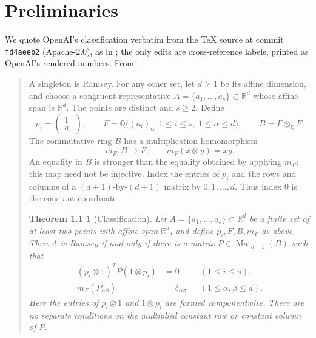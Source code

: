 \documentclass[11pt]{amsart}
\newcommand{\Q}{\mathbb{Q}}
\newcommand{\R}{\mathbb{R}}
\theoremstyle{plain}
\newtheorem*{oaithm}{Theorem 1.1}
\theoremstyle{definition}
\begin{document}
\section{Preliminaries}\label{sec:prelim}

We quote OpenAI's classification verbatim from the \TeX{} source at commit \texttt{fd4aeeb2}
(Apache-2.0), as in \cite{MR}; the only edits are cross-reference labels, printed as OpenAI's
rendered numbers. From \cite[\S1.1]{OAI172}:

{\small
\begin{quote}
A singleton is Ramsey. For any other set, let $d\ge1$ be its affine
dimension, and choose a congruent representative
$A=\{a_1,\ldots,a_s\}\subset\R^d$ whose affine span is $\R^d$.
The points are distinct and $s\ge2$. Define
\[
 p_i=\begin{pmatrix}1\\a_i\end{pmatrix},\qquad
 F=\Q\bigl((a_i)_\alpha:1\le i\le s,\ 1\le\alpha\le d\bigr),
 \qquad B=F\otimes_{\Q}F.
\]
The commutative ring $B$ has a multiplication homomorphism
\[
 m_F:B\longrightarrow F,\qquad m_F(x\otimes y)=xy.
\]
An equality in $B$ is stronger than the equality obtained by applying
$m_F$; this map need not be injective. Index the entries of $p_i$ and
the rows and columns of a $(d+1)$-by-$(d+1)$ matrix by $0,1,\ldots,d$.
Thus index $0$ is the constant coordinate.

\begin{oaithm}[Classification]
Let $A=\{a_1,\ldots,a_s\}\subset\R^d$ be a finite set of at least two
points with affine span $\R^d$, and define $p_i,F,B,m_F$ as above.
Then $A$ is Ramsey if and only if there is a matrix
$P\in\operatorname{Mat}_{d+1}(B)$ such that
\begin{align}
 (p_i\otimes1)^T P(1\otimes p_i)&=0
       &&(1\le i\le s),\tag{1}\\
 m_F(P_{\alpha\beta})&=\delta_{\alpha\beta}
       &&(1\le\alpha,\beta\le d).\tag{2}
\end{align}
Here the entries of $p_i\otimes1$ and $1\otimes p_i$ are formed
componentwise. There are no separate conditions on the multiplied
constant row or constant column of $P$.
\end{oaithm}
\end{quote}
}
\end{document}
